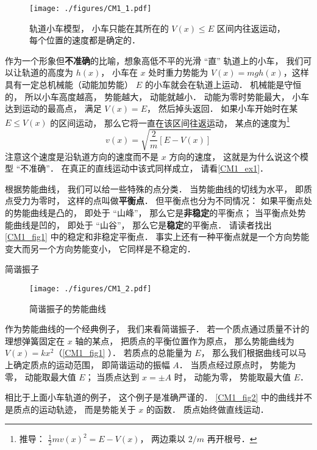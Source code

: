 \begin{figure}[ht]
\centering
\texttt{[image: ./figures/CM1\_1.pdf]}
\caption{轨道小车模型， 小车只能在其所在的 $V(x) \leqslant E$ 区间内往返运动， 每个位置的速度都是确定的．} \label{CM1_fig1}
\end{figure}

作为一个形象但\textbf{不准确}的比喻，想象高低不平的光滑 “直” 轨道上的小车， 我们可以让轨道的高度为 $h(x)$， 小车在 $x$ 处时重力势能为 $V(x) = mgh(x)$，这样具有一定总机械能（动能加势能） $E$ 的小车就会在轨道上运动． 机械能是守恒的， 所以小车高度越高， 势能越大， 动能就越小． 动能为零时势能最大， 小车达到运动的最高点， 满足 $V(x) = E$， 然后掉头返回． 如果小车开始时在某 $E \leq V(x)$ 的区间运动， 那么它将一直在该区间往返运动， 某点的速度为\footnote{推导： $\frac{1}{2}mv(x)^2 = E - V(x)$， 两边乘以 $2/m$ 再开根号．}
\begin{equation}\label{CM1_eq1}
v(x) = \sqrt{\frac{2}{m}[E - V(x)]}
\end{equation}
注意这个速度是沿轨道方向的速度而不是 $x$ 方向的速度， 这就是为什么说这个模型 “不准确”． 在真正的直线运动中该式同样成立， 请看\autoref{CM1_ex1}．

根据势能曲线， 我们可以给一些特殊的点分类． 当势能曲线的切线为水平， 即质点受力为零时， 这样的点叫做\textbf{平衡点}． 但平衡点也分为不同情况： 如果平衡点处的势能曲线是凸的， 即处于 “山峰”， 那么它是\textbf{非稳定}的平衡点； 当平衡点处势能曲线是凹的， 即处于 “山谷”， 那么它是\textbf{稳定}的平衡点． 请读者找出\autoref{CM1_fig1} 中的稳定和非稳定平衡点． 事实上还有一种平衡点就是一个方向势能变大而另一个方向势能变小， 它同样是不稳定的．


\begin{example}{简谐振子}\label{CM1_ex1}
\begin{figure}[ht]
\centering
\texttt{[image: ./figures/CM1\_2.pdf]}
\caption{简谐振子的势能曲线} \label{CM1_fig2}
\end{figure}

作为势能曲线的一个经典例子， 我们来看简谐振子． 若一个质点通过质量不计的理想弹簧固定在 $x$ 轴的某点， 把质点的平衡位置作为原点， 那么势能曲线为 $V(x) = kx^2$（\autoref{CM1_fig1} ）． 若质点的总能量为 $E$， 那么我们根据曲线可以马上确定质点的运动范围， 即简谐运动的振幅 $A$． 当质点经过原点时， 势能为零， 动能取最大值 $E$； 当质点达到 $x = \pm A$ 时， 动能为零， 势能取最大值 $E$．
\end{example}
相比于上面小车轨道的例子， 这个例子是准确严谨的． \autoref{CM1_fig2} 中的曲线并不是质点的运动轨迹， 而是势能关于 $x$ 的函数． 质点始终做直线运动．

